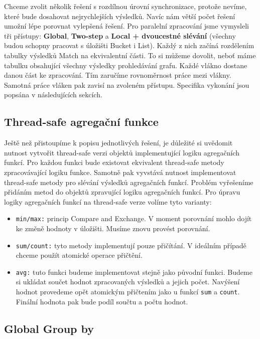 Chceme zvolit několik řešení s rozdílnou úrovní synchronizace, protože nevíme, které bude dosahovat nejrychlejších výsledků.
Navíc nám větší počet řešení umožní lépe porovnat vylepšená řešení.
Pro paralelní zpracování jsme vymysleli tři přístupy: \textbf{Global}, \textbf{Two-step} a \textbf{Local + dvoucestné slévání} (všechny budou schopny pracovat s úložišti Bucket i List).
Každý z nich začíná rozdělením tabulky výsledků Match na ekvivalentní části.
To si můžeme dovolit, neboť máme tabulku obsahující všechny výsledky prohledávání grafu.
Každé vlákno dostane danou část ke zpracování.
Tím zaručíme rovnoměrnost práce mezi vlákny.
Samotná práce vláken pak zavisí na zvoleném přístupu.
Specifika vykonání jsou popsána v následujících sekcích.

\subsection{Thread-safe agregační funkce}

Ještě než přistoupíme k popisu jednotlivých řešení, je důležité si uvědomit nutnost vytvořit thread-safe verzi objektů implementující logiku agregačních funkcí.
Pro každou funkci bude existovat ekvivalent thread-safe metody zpracovávající logiku funkce.
Samotně pak vyvstává nutnost implementovat thread-safe metody pro slévání výsledků agregačních funkcí.
Problém vyřešeníme přidáním metod do objektů zpravující logiku agregačních funkcí.
Pro úpravu logiky agregačních funkcí na thread-safe verze volíme tyto varianty:

\begin{itemize}

\item \texttt{min/max:} princip Compare and Exchange. V moment porovnání mohlo dojít ke změně hodnoty v úložišti.
Musíme znovu provést porovnání.  

\item \texttt{sum/count:} tyto metody implementují pouze přičítání. 
V ideálním případě chceme použít atomické operace přičtění.
 
\item \texttt{avg:} tuto funkci budeme implementovat stejně jako původní funkci. 
Budeme si ukládat součet hodnot zpracovaných výsledků a jejich počet.
Navýšení hodnot provedeme opět atomickým přičtením jako u funkcí \texttt{sum} a \texttt{count}.
Finální hodnota pak bude podíl součtu a počtu hodnot.
\end{itemize}

\subsection{Global Group by} \label{anal.groupby.global}

